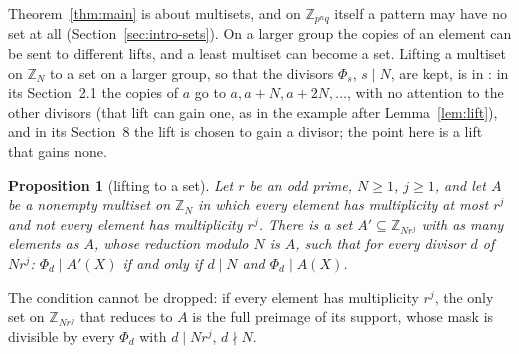\documentclass[11pt,a4paper]{amsart}
\newtheorem{proposition}[theorem]{Proposition}
\theoremstyle{definition}
\theoremstyle{remark}
\newcommand{\Z}{\mathbb{Z}}
\begin{document}
Theorem~\ref{thm:main} is about multisets, and on $\Z_{p^nq}$ itself a pattern may have no set at all
(Section~\ref{sec:intro-sets}). On a larger group the copies of an element can be sent to different lifts, and a
least multiset can become a set. Lifting a multiset on $\Z_N$ to a set on a larger group, so that the divisors
$\Phi_s$, $s\mid N$, are kept, is in \cite{KLaMS}: in its Section~2.1 the copies of $a$ go to $a,a+N,a+2N,\dots$,
with no attention to the other divisors (that lift can gain one, as in the example after Lemma~\ref{lem:lift}),
and in its Section~8 the lift is chosen to gain a divisor; the point here is a lift that gains none.

\begin{proposition}[lifting to a set]\label{prop:setlift}
Let $r$ be an odd prime, $N\ge1$, $j\ge1$, and let $A$ be a nonempty multiset on $\Z_N$ in which every element has
multiplicity at most $r^j$ and not every element has multiplicity $r^j$. There is a set $A'\subseteq\Z_{Nr^j}$
with as many elements as $A$, whose reduction modulo $N$ is $A$, such that for every divisor $d$ of $Nr^j$:
$\Phi_d\mid A'(X)$ if and only if $d\mid N$ and $\Phi_d\mid A(X)$.
\end{proposition}
The condition cannot be dropped: if every element has multiplicity $r^j$, the only set on $\Z_{Nr^j}$ that reduces to $A$ is
the full preimage of its support, whose mask is divisible by every $\Phi_d$ with $d\mid Nr^j$, $d\nmid N$.
\end{document}
